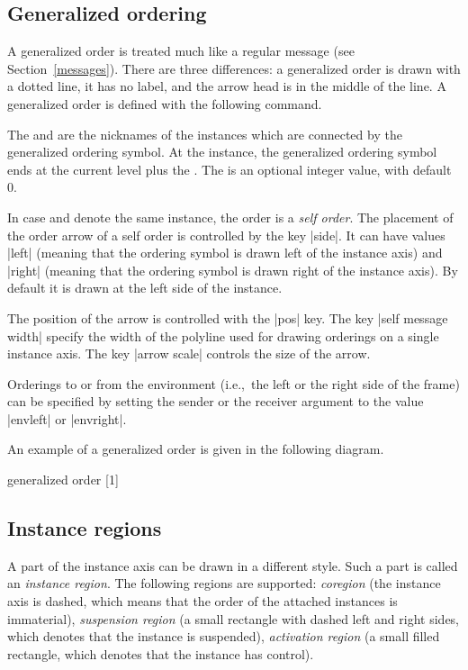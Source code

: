 \documentclass[12pt,a4paper]{article}
\begin{document}
\subsection{Generalized ordering}
\label{ordering}
A generalized order is treated much like a regular message (see
Section~\ref{messages}). There
are three differences: a generalized order is drawn with a
dotted line, it has no label, and the arrow head is in the middle of
the line. A generalized order is defined with the following command.
\begin{command}{\order{}}
The  and  are the nicknames of the
instances which are connected by the generalized ordering symbol.
At the  instance, the generalized ordering symbol ends
at the current level plus the . The
 is an optional integer value, with default 0.

In case  and  denote the same instance,
the order is a \emph{self order}.  The placement of the order arrow of
a self order is controlled by the key |side|.  It
can have values |left| (meaning that the ordering symbol is drawn
left of the instance axis) and |right| (meaning that the ordering
symbol is drawn right of the instance axis). By default it is drawn at
the left side of the instance.

The position of the arrow is controlled with the |pos| key. The key |self
message width| specify the width of the polyline used for drawing orderings on a
single instance axis. The key |arrow scale| controls the size of the arrow.

Orderings to or from the environment (i.e.,\ the left or the right side
of the \MSC{} frame) can be
specified by setting the sender or the receiver argument to the value
|envleft| or |envright|.
\end{command}

An example of a generalized order is given in the following diagram.
\begin{codeexample}[width=\linewidth-9.6cm]
\begin{msc}[head top distance=0.8cm]
           {generalized order}
[1]
\nextlevel
{}
\nextlevel
\end{msc}
\end{codeexample}

\subsection{Instance regions}
\label{regions}
A part of the instance axis can be drawn in a different style. Such a
part is called an {\em instance region}. The following
regions are supported:
{\em coregion} (the instance axis is dashed, which means that the order of the
attached instances is immaterial),
{\em suspension region} (a small rectangle with dashed left and right
sides, which denotes that the instance is suspended),
{\em activation region} (a small filled rectangle, which denotes that
the instance has control).
\end{document}
